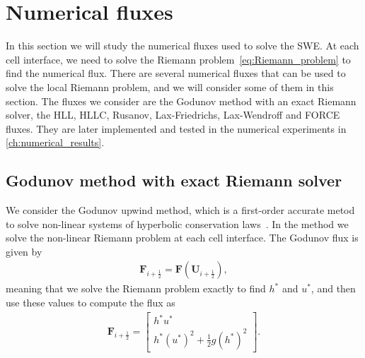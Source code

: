 \section{Numerical fluxes}
In this section we will study the numerical fluxes used to solve the SWE.
At each cell interface, we need to solve the Riemann problem~\eqref{eq:Riemann_problem} to find the numerical flux.
There are several numerical fluxes that can be used to solve the local Riemann problem, and we will consider some of them in this section.
The fluxes we consider are the Godunov method with an exact Riemann solver, the HLL, HLLC, Rusanov, Lax-Friedrichs, Lax-Wendroff and FORCE fluxes.
They are later implemented and tested in the numerical experiments in \autoref{ch:numerical_results}.

\subsection*{Godunov method with exact Riemann solver}
We consider the Godunov upwind method, which is a first-order accurate metod to solve non-linear systems of hyperbolic conservation laws~\cite{Toro2024}.
In the method we solve the non-linear Riemann problem at each cell interface.
The Godunov flux is given by
\begin{align*}
    \mathbf{F}_{i + \frac{1}{2}} = \mathbf{F}(\mathbf{U}_{i + \frac{1}{2}}),
\end{align*}
meaning that we solve the Riemann problem exactly to find $h^*$ and $u^*$, and then use these values to compute the flux as 
\begin{align*}
    \mathbf{F}_{i + \frac{1}{2}} = \begin{bmatrix}
        h^* u^* \\ h^* {(u^{*})}^2 + \frac{1}{2} g {(h^{*})}^2
    \end{bmatrix}.
\end{align*}

